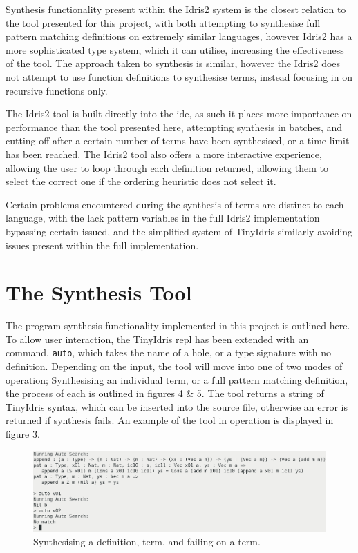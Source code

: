 \documentclass[a4paper]{article}
\begin{document}
Synthesis functionality present within the Idris2 system is the closest relation to the tool presented for this project, with
both attempting to synthesise full pattern matching definitions on extremely similar languages, however Idris2 has a more sophisticated type system, which it
can utilise, increasing the effectiveness of the tool. The approach taken to synthesis is similar, however the Idris2
does not attempt to use function definitions to synthesise terms, instead focusing in on recursive functions only.

The Idris2 tool is built directly into the ide, as such it places more importance on performance than the tool presented
here, attempting synthesis in batches, and cutting off after a certain number of terms have been synthesised, or a time
limit has been reached. The Idris2 tool also offers a more interactive experience, allowing the user to loop through
each definition returned, allowing them to select the correct one if the ordering heuristic does not select it. 

Certain problems encountered during the synthesis of terms are distinct to each language, with the lack pattern
variables in the full Idris2 implementation bypassing certain issued, and the simplified system of TinyIdris similarly avoiding issues present within the full implementation.


\clearpage

\section{The Synthesis Tool}
\label{sec:org4165c30}

The program synthesis functionality implemented in
this project is outlined here. To allow user interaction, the TinyIdris repl
has been extended with an command,
\texttt{auto}, which takes the name of a hole, or a type signature
with no definition. Depending on the input, the tool will move into
one of two modes of operation; Synthesising an individual term, or a
full pattern matching definition, the process of each is outlined in
figures 4 \& 5. The tool returns a string of TinyIdris
syntax, which can be inserted into the source file, otherwise an error is returned
if synthesis fails. An example of the tool in operation is displayed in figure 3. 

\begin{center}
\begin{figure}[htbp]
\centering
\includegraphics[scale=0.25]{./Resource/running.png}
\caption{Synthesising a definition, term, and failing on a term.}
\end{figure}
\end{center}
\end{document}
